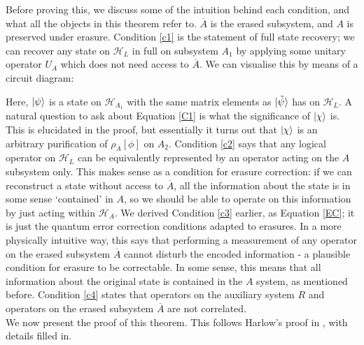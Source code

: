 \documentclass[12pt,a4paper]{report}
\numberwithin{equation}{section}
\newcommand{\ol}[1]{\overline{#1}}
\theoremstyle{definition}
\theoremstyle{theorem}
\theoremstyle{theorem}
\theoremstyle{example}
\theoremstyle{definition}
\begin{document}
Before proving this, we discuss some of the intuition behind each condition, and what all the objects in this theorem refer to. $\ol{A}$ is the erased subsystem, and $A$ is preserved under erasure. Condition \ref{c1} is the statement of full state recovery; we can recover any state on $\mathcal{H}_{L}$ in full on subsystem $A_{1}$ by applying some unitary operator $U_{A}$ which does not need access to $\ol{A}$. We can visualise this by means of a circuit diagram:
\begin{figure}[H] 
	\centering
\end{figure}
Here, $\ket{\psi}$ is a state on $\mathcal{H}_{A_{1}}$ with the same matrix elements as $\ket{\tilde{\psi}}$ has on $\mathcal{H}_{L}$. A natural question to ask about Equation \ref{C1} is what the significance of $\ket{\chi}$ is. This is elucidated in the proof, but essentially it turns out that $\ket{\chi}$ is an arbitrary purification of $\rho_{\ol{A}}[\phi]$ on $A_{2}$. Condition \ref{c2} says that any logical operator on $\mathcal{H}_{L}$ can be equivalently represented by an operator acting on the $A$ subsystem only. This makes sense as a condition for erasure correction: if we can reconstruct a state without access to $\ol{A}$, all the information about the state is in some sense `contained' in $A$, so we should be able to operate on this information by just acting within $\mathcal{H}_{A}$. We derived Condition \ref{c3} earlier, as Equation \ref{EC}; it is just the quantum error correction conditions adapted to erasures. In a more physically intuitive way, this says that performing a measurement of any operator on the erased subsystem $\ol{A}$ cannot disturb the encoded information - a plausible condition for erasure to be correctable. In some sense, this means that all information about the original state is contained in the $A$ system, as mentioned before. Condition \ref{c4} states that operators on the auxiliary system $R$ and operators on the erased subsystem $\ol{A}$ are not correlated.\\
We now present the proof of this theorem. This follows Harlow's proof in \cite{Harlow}, with details filled in.
\end{document}
